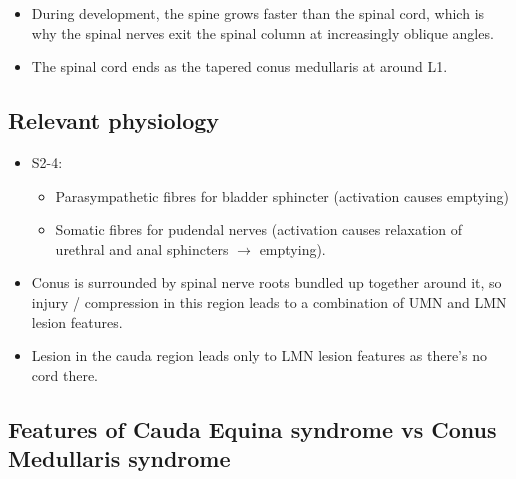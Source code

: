 \documentclass[
  12pt,
]{memoir}
\providecommand{\tightlist}{%
  \setlength{\itemsep}{0pt}\setlength{\parskip}{0pt}}
\begin{document}
\begin{itemize}
\tightlist
\item
  During development, the spine grows faster than the spinal cord, which
  is why the spinal nerves exit the spinal column at increasingly
  oblique angles.
\item
  The spinal cord ends as the tapered conus medullaris at around L1.
\end{itemize}

\pagebreak

\hypertarget{relevant-physiology}{%
\subsection{Relevant physiology}\label{relevant-physiology}}

\begin{itemize}
\tightlist
\item
  S2-4:

  \begin{itemize}
  \tightlist
  \item
    Parasympathetic fibres for bladder sphincter (activation causes
    emptying)
  \item
    Somatic fibres for pudendal nerves (activation causes relaxation of
    urethral and anal sphincters \(\rightarrow\) emptying).
  \end{itemize}
\item
  Conus is surrounded by spinal nerve roots bundled up together around
  it, so injury / compression in this region leads to a combination of
  UMN and LMN lesion features.
\item
  Lesion in the cauda region leads only to LMN lesion features as
  there's no cord there.
\end{itemize}

\hypertarget{features-of-cauda-equina-syndrome-vs-conus-medullaris-syndrome}{%
\subsection{Features of Cauda Equina syndrome vs Conus Medullaris
syndrome}\label{features-of-cauda-equina-syndrome-vs-conus-medullaris-syndrome}}
\end{document}
